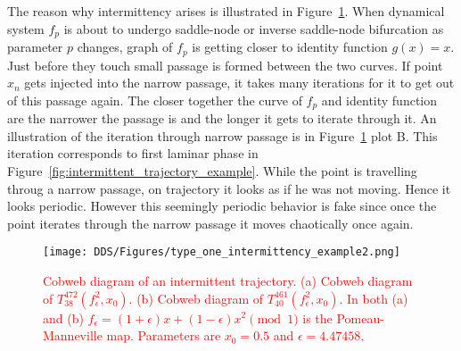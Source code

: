 The reason why intermittency arises is illustrated in Figure~\ref{fig:intermittent_cobweb_example}.
When dynamical system $f_p$ is about to undergo saddle-node or inverse saddle-node bifurcation as parameter $p$ changes, graph of $f_p$ is getting closer to identity function $g(x)=x$.
Just before they touch small passage is formed between the two curves.
If point $x_n$ gets injected into the narrow passage, it takes many iterations for it to get out of this passage again.
The closer together the curve of $f_p$ and identity function are the narrower the passage is and the longer it gets to iterate through it.
An illustration of the iteration through narrow passage is in Figure~\ref{fig:intermittent_cobweb_example} plot B.
This iteration corresponds to first laminar phase in Figure~\ref{fig:intermittent_trajectory_example}.
While the point is travelling throug a narrow passage, on trajectory it looks as if he was not moving.
Hence it looks periodic.
However this seemingly periodic behavior is fake since once the point iterates through the narrow passage it moves chaotically once again.

\begin{figure}[!h]
    \centering
    \texttt{[image: DDS/Figures/type\_one\_intermittency\_example2.png]}
    \caption{
        \textcolor{red}{
        Cobweb diagram of an intermittent trajectory. 
        (a) Cobweb diagram of $T^{472}_{38}(f_{\epsilon}^{2}, x_0)$. 
        (b) Cobweb diagram of $T^{461}_{40}(f_{\epsilon}^{2}, x_0)$. 
        In both (a) and (b) $f_{\epsilon} = (1+\epsilon)x+(1-\epsilon)x^2 \pmod{1}$ is the Pomeau-Manneville map. 
        Parameters are $x_0 = 0.5$ and $\epsilon = 4.47458$.
        }
    }
    \label{fig:intermittent_cobweb_example}
\end{figure}


